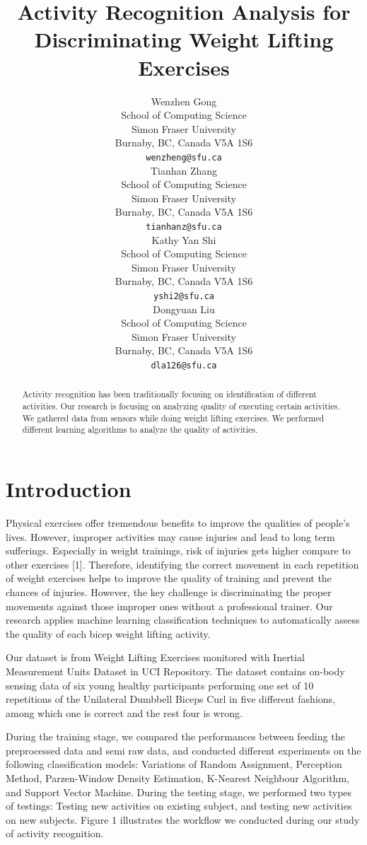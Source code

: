\documentclass{article} %
\title{Activity Recognition Analysis for Discriminating Weight Lifting Exercises}
\author{
Wenzhen Gong \\
School of Computing Science\\
Simon Fraser University\\
Burnaby, BC, Canada V5A 1S6 \\
\texttt{wenzheng@sfu.ca} \\
\And
Tianhan Zhang \\
School of Computing Science\\
Simon Fraser University\\
Burnaby, BC, Canada V5A 1S6 \\
\texttt{tianhanz@sfu.ca} \\
\AND
Kathy Yan Shi \\
School of Computing Science\\
Simon Fraser University\\
Burnaby, BC, Canada V5A 1S6 \\
\texttt{yshi2@sfu.ca} \\
\And
Dongyuan Liu \\
School of Computing Science\\
Simon Fraser University\\
Burnaby, BC, Canada V5A 1S6 \\
\texttt{dla126@sfu.ca} \\
}
\begin{document}
\maketitle

\begin{abstract}
Activity recognition has been traditionally focusing on identification of different activities. Our research is focusing on analyzing quality of executing certain activities. We gathered data from sensors while doing weight lifting exercises. We performed different learning algorithms to analyze the quality of activities.
\end{abstract}

\section{Introduction}

Physical exercises offer tremendous benefits to improve the qualities of people’s lives. However, improper activities may cause injuries and lead to long term sufferings. Especially in weight trainings, risk of injuries gets higher compare to other exercises [1]. Therefore, identifying the correct movement in each repetition of weight exercises helps to improve the quality of training and prevent the chances of injuries. However, the key challenge is discriminating the proper movements against those improper ones without a professional trainer. Our research applies machine learning classification techniques to automatically assess the quality of each bicep weight lifting activity.

Our dataset is from Weight Lifting Exercises monitored with Inertial Measurement Units Dataset in UCI Repository. The dataset contains on-body sensing data of six young healthy participants performing one set of 10 repetitions of the Unilateral Dumbbell Biceps Curl in five different fashions, among which one is correct and the rest four is wrong.

During the training stage, we compared the performances between feeding the preprocessed data and semi raw data, and conducted different experiments on the following classification models: Variations of Random Assignment, Perception Method, Parzen-Window Density Estimation, K-Nearest Neighbour Algorithm, and Support Vector Machine. During the testing stage, we performed two types of testings: Testing new activities on existing subject, and testing new activities on new subjects. Figure 1 illustrates the workflow we conducted during our study of activity recognition.
\end{document}

